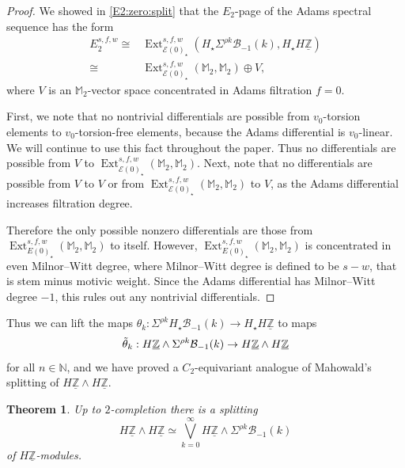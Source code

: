 \documentclass{amsart}
\newtheorem{theorem}[equation]{Theorem}
\theoremstyle{plain}
\numberwithin{equation}{section}
\numberwithin{figure}{section}
\DeclareMathOperator{\Ext}{Ext}
\newcommand{\mM}{{\mathbb M}}
\newcommand{\mN}{{\mathbb N}}
\newcommand{\mZ}{{\mathbb Z}}
\newcommand{\cB}{{\mathcal B}}
\newcommand{\cE}{{\mathcal E}}
\newcommand{\umZ}{\underline{\mZ}}
\newcommand{\0}{\langle 0 \rangle }
\begin{document}
\begin{proof}
We showed in \cref{E2:zero:split} that the $E_{2}$-page of the Adams spectral sequence has the form
\begin{align*}
E_2^{s, f, w} \cong & \Ext_{\cE(0)_{\star}}^{s,f, w} (H_{\star} \Sigma^{\rho k} \cB_{-1}(k), H_{\star} H \umZ ) \\
\cong & \Ext_{\cE(0)_{\star}}^{s,f,w} (\mM_2, \mM_2) \oplus V,
\end{align*}
where $V$ is an $\mM_{2}$-vector space concentrated in Adams filtration $f=0$. 

First, we note that no nontrivial differentials are possible from $v_{0}$-torsion elements to $v_{0}$-torsion-free elements, because the Adams differential is $v_{0}$-linear. We will continue to use this fact throughout the paper. Thus no differentials are possible from $V$ to $\Ext_{\cE(0)_{\star}}^{s,f,w} (\mM_2, \mM_2)$. Next, note that no differentials are possible from $V$ to $V$ or from $\Ext_{\cE(0)_{\star}}^{s,f,w} (\mM_2, \mM_2)$ to $V$, as the Adams differential increases filtration degree.  

Therefore the only possible nonzero differentials are those from $\Ext_{E(0)_{\star}}^{s,f,w} (\mM_2, \mM_2)$ to itself. However, $\Ext_{E(0)_{\star}}^{s,f,w} (\mM_2, \mM_2)$ is concentrated in even Milnor--Witt degree, where Milnor--Witt degree is defined to be $s-w$, that is stem minus motivic weight. Since the Adams differential has Milnor--Witt degree $-1$, this rules out any nontrivial differentials. 
\end{proof}

Thus we can lift the maps $\theta_k : \Sigma^{\rho k} H_{\star} \cB_{-1} (k) \to H_{\star} H \umZ$ to maps
\[
\Tilde{\theta}_k : H \umZ \wedge \Sigma^{\rho k} \cB_{-1} (k) \to H \umZ \wedge H \umZ
\]
for all $n \in \mN$, and we have proved a $C_{2}$-equivariant analogue of Mahowald's splitting of $H \umZ \wedge H \umZ$.

\begin{theorem}\label{thm: height zero splitting} Up to $2$-completion there is a splitting
\[ 
H \umZ \wedge H \umZ \simeq \bigvee\limits_{k=0}^{\infty} H \umZ \wedge \Sigma^{\rho k}\cB_{-1}(k) 
\]
of $H \umZ$-modules.
\end{theorem}
\end{document}
